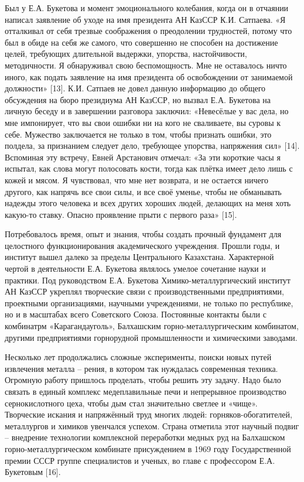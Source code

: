 Был у Е.А. Букетова и момент эмоционального колебания, когда он в
отчаянии написал заявление об уходе на имя президента АН КазССР К.И.
Сатпаева. «Я отталкивал от себя трезвые соображения о преодолении
трудностей, потому что был в обиде на себя же самого, что совершенно не
способен на достижение целей, требующих длительной выдержки, упорства,
настойчивости, методичности. Я обнаруживал свою беспомощность. Мне не
оставалось ничто иного, как подать заявление на имя президента об
освобождении от занимаемой должности» {[}13{]}. К.И. Сатпаев не довел
данную информацию до общего обсуждения на бюро президиума АН КазССР, но
вызвал Е.А. Букетова на личную беседу и в завершении разговора заключил:
«Невесёлые у вас дела, но мне импонирует, что вы свои ошибки ни на кого
не сваливаете, вы суровы к себе. Мужество заключается не только в том,
чтобы признать ошибки, это полдела, за признанием следует дело,
требующее упорства, напряжения сил» {[}14{]}. Вспоминая эту встречу,
Евней Арстанович отмечал: «За эти короткие часы я испытал, как слова
могут полосовать кости, тогда как плётка имеет дело лишь с кожей и
мясом. Я чувствовал, что мне нет возврата, и не остается ничего другого,
как напрячь все свои силы, и все своё уменье, чтобы не обманывать
надежды этого человека и всех других хороших людей, делающих на меня
хоть какую-то ставку. Опасно проявление прыти с первого раза» {[}15{]}.

Потребовалось время, опыт и знания, чтобы создать прочный фундамент для
целостного функционирования академического учреждения. Прошли годы, и
институт вышел далеко за пределы Центрального Казахстана. Характерной
чертой в деятельности Е.А. Букетова являлось умелое сочетание науки и
практики. Под руководством Е.А. Букетова Химико-металлургический
институт АН КазССР укреплял творческие связи с производственными
предприятиями, проектными организациями, научными учреждениями, не
только по республике, но и в масштабах всего Советского Союза.
Постоянные контакты были с комбинатрм «Карагандауголь», Балхашским
горно-металлургическим комбинатом, другими предприятиями горнорудной
промышленности и химическими заводами.

Несколько лет продолжались сложные эксперименты, поиски новых путей
извлечения металла -- рения, в котором так нуждалась современная
техника. Огромную работу пришлось проделать, чтобы решить эту задачу.
Надо было связать в единый комплекс медеплавильные печи и непрерывное
производство сернокислотного цеха, чтобы дым стал значительно светлее и
«чище». Творческие искания и напряжённый труд многих людей:
горняков-обогатителей, металлургов и химиков увенчался успехом. Страна
отметила этот научный подвиг -- внедрение технологии комплексной
переработки медных руд на Балхашском горно-металлургическом комбинате
присуждением в 1969 году Государственной премии СССР группе специалистов
и ученых, во главе с профессором Е.А. Букетовым {[}16{]}.

